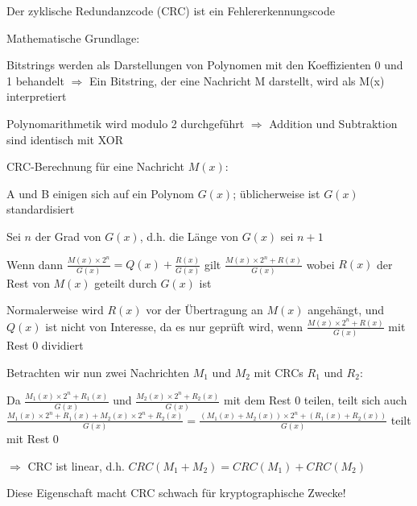 \documentclass[a4paper]{article}
\begin{document}
\begin{multicols}{3}
      \begin{itemize*}
            \item Der zyklische Redundanzcode (CRC) ist ein Fehlererkennungscode
            \item Mathematische Grundlage:
            \begin{itemize*}
                  \item Bitstrings werden als Darstellungen von Polynomen mit den Koeffizienten 0 und 1 behandelt $\Rightarrow$ Ein Bitstring, der eine Nachricht M darstellt, wird als M(x) interpretiert
                  \item Polynomarithmetik wird modulo 2 durchgeführt $\Rightarrow$ Addition und Subtraktion sind identisch mit XOR
            \end{itemize*}
            \item CRC-Berechnung für eine Nachricht $M(x)$:
            \begin{itemize*}
                  \item A und B einigen sich auf ein Polynom $G(x)$; üblicherweise ist $G(x)$ standardisiert
                  \item Sei $n$ der Grad von $G(x)$, d.h. die Länge von $G(x)$ sei $n+1$
                  \item Wenn dann $\frac{M(x)\times 2^n}{G(x)}=Q(x)+\frac{R(x)}{G(x)}$ gilt $\frac{M(x)\times 2^n +R(x)}{G(x)}$ wobei $R(x)$ der Rest von $M(x)$ geteilt durch $G(x)$ ist
                  \item Normalerweise wird $R(x)$ vor der Übertragung an $M(x)$ angehängt, und $Q(x)$ ist nicht von Interesse, da es nur geprüft wird, wenn $\frac{M(x)\times 2^n+R(x)}{G(x)}$ mit Rest $0$ dividiert
            \end{itemize*}
            \item Betrachten wir nun zwei Nachrichten $M_1$ und $M_2$ mit CRCs
            $R_1$ und $R_2$:
            \begin{itemize*}
                  \item Da $\frac{M_1(x)\times 2^n+R_1(x)}{G(x)}$ und $\frac{M_2(x)\times 2^n+R_2(x)}{G(x)}$ mit dem Rest $0$ teilen, teilt sich auch $\frac{M_1(x)\times 2^n +R_1(x)+M_2(x)\times 2^n +R_2(x)}{G(x)} =\frac{(M_1(x)+M_2(x))\times 2^n +(R_1(x)+R_2(x))}{G(x)}$ teilt mit Rest $0$
                  \item $\Rightarrow$ CRC ist linear, d.h. $CRC(M_1 + M_2) = CRC(M_1) + CRC(M_2)$
            \end{itemize*}
            \item Diese Eigenschaft macht CRC schwach für kryptographische Zwecke!
      \end{itemize*}



\end{multicols}
\end{document}
